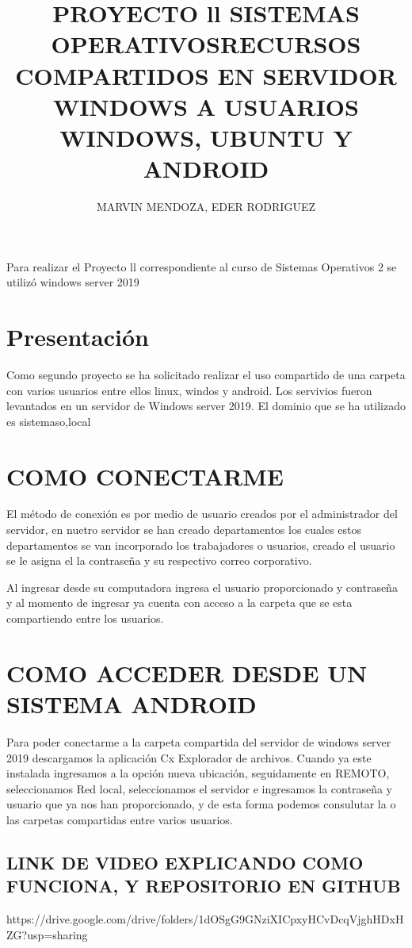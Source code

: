 \documentclass[10pt,a4paper]{article}
\author{MARVIN MENDOZA, EDER RODRIGUEZ}
\title{PROYECTO ll SISTEMAS OPERATIVOS}
\begin{document}
\title{RECURSOS COMPARTIDOS EN SERVIDOR WINDOWS A USUARIOS WINDOWS, UBUNTU Y ANDROID}
\maketitle
Para realizar el Proyecto ll correspondiente al curso de Sistemas Operativos 2 se utilizó windows server 2019




\section{Presentación}
Como segundo proyecto se ha solicitado realizar el uso compartido de una carpeta con varios usuarios entre ellos linux, windos y android.
Los servivios fueron levantados en un servidor de Windows server 2019.
El dominio que se ha utilizado es sistemaso,local

\section{COMO CONECTARME}
El método de conexión es por medio de usuario creados por el administrador del servidor, en nuetro servidor se han creado departamentos los cuales estos departamentos se van incorporado los trabajadores o usuarios, creado el usuario se le asigna el la contraseña y su respectivo correo corporativo.

Al ingresar desde su computadora ingresa el usuario proporcionado y contraseña y al momento de ingresar ya cuenta con acceso a la carpeta que se esta compartiendo entre los usuarios.


\section{COMO ACCEDER DESDE UN SISTEMA ANDROID}
Para poder conectarme a la carpeta compartida del servidor de windows server 2019 descargamos la aplicación Cx Explorador de archivos. Cuando ya este instalada ingresamos a la opción nueva ubicación, seguidamente en REMOTO, seleccionamos Red local, seleccionamos el servidor e ingresamos la contraseña y usuario que ya nos han proporcionado, y de esta forma podemos consulutar la o las carpetas compartidas entre varios usuarios.

\subsection{LINK DE VIDEO EXPLICANDO COMO FUNCIONA, Y REPOSITORIO EN GITHUB}
https://drive.google.com/drive/folders/1dOSgG9GNziXICpxyHCvDcqVjghHDxHZG?usp=sharing
\end{document}
